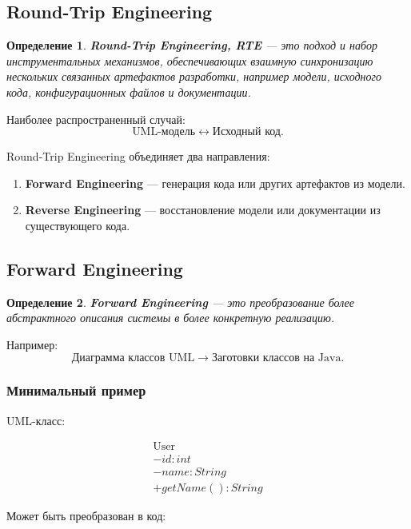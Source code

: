 \documentclass[12pt,a4paper]{article}
\newtheorem{definition}{Определение}
\begin{document}
\subsection{Round-Trip Engineering}

\begin{definition}
\textbf{Round-Trip Engineering, RTE} --- это подход и набор инструментальных механизмов, обеспечивающих взаимную синхронизацию нескольких связанных артефактов разработки, например модели, исходного кода, конфигурационных файлов и документации.
\end{definition}

Наиболее распространенный случай:
\[
\text{UML-модель}
\leftrightarrow
\text{Исходный код}.
\]

Round-Trip Engineering объединяет два направления:
\begin{enumerate}
    \item \textbf{Forward Engineering} --- генерация кода или других артефактов из модели.
    \item \textbf{Reverse Engineering} --- восстановление модели или документации из существующего кода.
\end{enumerate}

\subsection{Forward Engineering}

\begin{definition}
\textbf{Forward Engineering} --- это преобразование более абстрактного описания системы в более конкретную реализацию.
\end{definition}

Например:
\[
\text{Диаграмма классов UML}
\rightarrow
\text{Заготовки классов на Java}.
\]

\subsubsection*{Минимальный пример}

UML-класс:

\[
\boxed{
\begin{array}{l}
\text{User}\\
\hline
-id: int\\
-name: String\\
\hline
+getName(): String
\end{array}
}
\]

Может быть преобразован в код:
\end{document}
